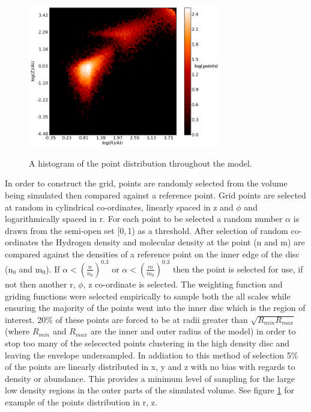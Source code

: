 \documentclass[useAMS,usenatbib]{mn2e}
\begin{document}
\begin{figure}
 \includegraphics[width=84mm]{Figures/model/lime_points_rz_histo.png}
 \label{points}
 \caption{A histogram of the point distribution throughout the model.}
\end{figure}

In order to construct the grid, points are randomly selected from the volume being simulated then compared against a reference point. Grid points are selected at random in cylindrical co-ordinates, linearly spaced in z and $\phi$ and logarithmically spaced in r. For each point to be selected a random number $\alpha$ is drawn from the semi-open set [0,$\,$1) as a threshold. After selection of random co-ordinates the Hydrogen density and molecular density at the point (n and m) are compared against the densities of a reference point on the inner edge of the disc (n$_0$ and m$_0$). If $\alpha<\left( \frac{n}{n_0} \right)^{0.3}$ or $\alpha< \left( \frac{m}{m_0} \right)^{0.3}$ then the point is selected for use, if not then another r, $\phi$, z co-ordinate is selected. The weighting function and griding functions were selected empirically to sample both the all scales while ensuring the majority of the points went into the inner disc which is the region of interest. 20\% of these points are forced to be at radii greater than $\sqrt{R_{min}R_{max}}$ (where $R_{min}$ and $R_{max}$ are the inner and outer radius of the model) in order to stop too many of the selecected points clustering in the high density disc and leaving the envelope undersampled. In addiation to this method of selection 5\% of the points are linearly distributed in x, y and z with no bias with regards to density or abundance. This provides a minimum level of sampling for the large low density regions in the outer parts of the simulated volume. See figure \ref{points} for example of the points distribution in r, z. \newline
\end{document}
